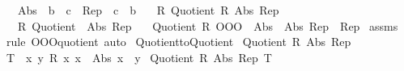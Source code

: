 \begin{isabellebody}
\ \ \ Abs{}\ {\isacharcolon}{\kern0pt}{\isacharcolon}{\kern0pt}\ {\isachardoublequoteopen}{\isacharprime}{\kern0pt}b\ {\isasymRightarrow}\ {\isacharprime}{\kern0pt}c{\isachardoublequoteclose}\ \ Rep{}\ {\isacharcolon}{\kern0pt}{\isacharcolon}{\kern0pt}\ {\isachardoublequoteopen}{\isacharprime}{\kern0pt}c\ {\isasymRightarrow}\ {\isacharprime}{\kern0pt}b{\isachardoublequoteclose}\isanewline
\ \ \ R{}{\isacharcolon}{\kern0pt}\ {\isachardoublequoteopen}Quotient{}\ R{}\ Abs{}\ Rep{}{\isachardoublequoteclose}\isanewline
\ \ \ R{}{\isacharcolon}{\kern0pt}\ {\isachardoublequoteopen}Quotient{}\ {\isacharparenleft}{\kern0pt}{\isacharequal}{\kern0pt}{\isacharparenright}{\kern0pt}\ Abs{}\ Rep{}{\isachardoublequoteclose}\isanewline
\ \ \ {\isachardoublequoteopen}Quotient{}\ {\isacharparenleft}{\kern0pt}R{}\ OOO\ {\isacharparenleft}{\kern0pt}{\isacharequal}{\kern0pt}{\isacharparenright}{\kern0pt}{\isacharparenright}{\kern0pt}\ {\isacharparenleft}{\kern0pt}Abs{}\ {\isasymcirc}\ Abs{}{\isacharparenright}{\kern0pt}\ {\isacharparenleft}{\kern0pt}Rep{}\ {\isasymcirc}\ Rep{}{\isacharparenright}{\kern0pt}{\isachardoublequoteclose}\isanewline
%
\isadelimproof
%
\endisadelimproof
%
\isatagproof
{}\isamarkupfalse%
\ assms\isanewline
{}\isamarkupfalse%
\ {\isacharparenleft}{\kern0pt}rule\ OOO{\isacharunderscore}{\kern0pt}quotient{}{\isacharparenright}{\kern0pt}\ auto%
\endisatagproof
{\isafoldproof}%
%
\isadelimproof
%
\endisadelimproof
%
\isadelimdocument
%
\endisadelimdocument
%
\isatagdocument
%
\isamarkuptrue%
%
\endisatagdocument
{\isafolddocument}%
%
\isadelimdocument
%
\endisadelimdocument
{}\isamarkupfalse%
\ Quotient{}{\isacharunderscore}{\kern0pt}to{\isacharunderscore}{\kern0pt}Quotient{\isacharcolon}{\kern0pt}\isanewline
{}\ {\isachardoublequoteopen}Quotient{}\ R\ Abs\ Rep{\isachardoublequoteclose}\isanewline
{}\ {\isachardoublequoteopen}T\ {\isasymequiv}\ {\isasymlambda}x\ y{\isachardot}{\kern0pt}\ R\ x\ x\ {\isasymand}\ Abs\ x\ {\isacharequal}{\kern0pt}\ y{\isachardoublequoteclose}\isanewline
{}\ {\isachardoublequoteopen}Quotient\ R\ Abs\ Rep\ T{\isachardoublequoteclose}\isanewline
%
\isadelimproof
%
\endisadelimproof

\end{isabellebody}
